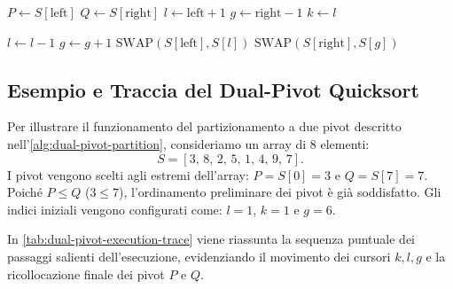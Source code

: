\begin{algorithm}[H]
\caption{Dual-Pivot Partitioning (Yaroslavskiy)}
\label{alg:dual-pivot-partition}

$P \leftarrow S[\text{left}]$\;
$Q \leftarrow S[\text{right}]$\;
$l \leftarrow \text{left} + 1$\;
$g \leftarrow \text{right} - 1$\;
$k \leftarrow l$\;

$l \leftarrow l - 1$\;
$g \leftarrow g + 1$\;
$\text{SWAP}(S[\text{left}], S[l])$\;
$\text{SWAP}(S[\text{right}], S[g])$\;
\;
\end{algorithm}

\FloatBarrier
\subsection{Esempio e Traccia del Dual-Pivot Quicksort}
\label{subsec:dual-pivot-trace-example}

Per illustrare il funzionamento del partizionamento a due pivot descritto nell'\autoref{alg:dual-pivot-partition}, consideriamo un array di 8 elementi:
\begin{equation}
  S = [3, \, 8, \, 2, \, 5, \, 1, \, 4, \, 9, \, 7].
\end{equation}
I pivot vengono scelti agli estremi dell'array: $P = S[0] = 3$ e $Q = S[7] = 7$. Poiché $P \le Q$ ($3 \le 7$), l'ordinamento preliminare dei pivot è già soddisfatto. Gli indici iniziali vengono configurati come: $l = 1$, $k = 1$ e $g = 6$.

In \autoref{tab:dual-pivot-execution-trace} viene riassunta la sequenza puntuale dei passaggi salienti dell'esecuzione, evidenziando il movimento dei cursori $k, l, g$ e la ricollocazione finale dei pivot $P$ e $Q$.

